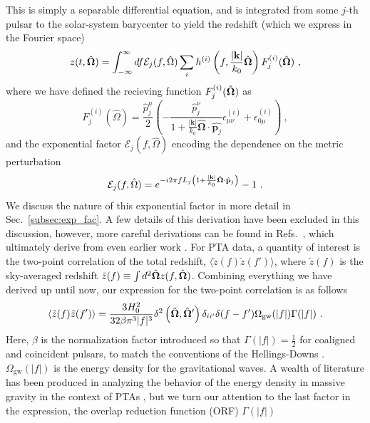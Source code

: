 \documentclass[prd,aps,psfig,nofootinbib,nobibnotes,superscriptaddress,preprintnumbers,times]{revtex4-2}\setlength{\topmargin}{-14mm}
\begin{document}
This is simply a separable differential equation, and is integrated from some $j$-th pulsar to the solar-system barycenter to yield the redshift (which we express in the Fourier space)
\begin{equation}\label{eqn:redshift}
    z(t, \hat{\bf \Omega}) = \int_{-\infty}^\infty df \mathcal{E}_j(f, \hat{\Omega}) \sum_i h^{(i)}\left(f, \frac{|{\bf k}|}{k_0} \hat{\bf \Omega}\right)F^{(i)}_j(\hat{\bf \Omega}) \ ,
\end{equation}
where we have defined the recieving function $F^{(i)}_j(\hat{\bf \Omega}) $ as 
\begin{equation}\label{eqn:recieving}
    F^{(i)}_j(\hat{\Omega}) = \frac{\hat{p}^\mu_j}{2}\left(-\frac{\hat{p}^\nu_j}{1+\frac{|\boldsymbol{k}|}{k_0} \hat{\boldsymbol{\Omega}} \cdot \hat{\boldsymbol{p}_j}} \epsilon_{\mu \nu}^{(i)}+\epsilon_{0 \mu}^{(i)}\right) \ ,
\end{equation}
and the exponential factor $\mathcal{E}_j(f, \hat{\Omega})$ encoding the dependence on the metric perturbation
\begin{equation}
    \mathcal{E}_j(f, \hat{\Omega}) = e^{-i2\pi f L_j\left( 1 + \frac{|{\bf k}|}{k_0} \hat{\bf \Omega}\cdot \hat{\bf p}_j\right)} - 1 \ . 
\end{equation}
We discuss the nature of this exponential factor in more detail in Sec.\ \ref{subsec:exp_fac}. A few details of this derivation have been excluded in this discussion, however, more careful derivations can be found in Refs.\ \cite{Anholm:2008wy, Liang:2021bct}, which ultimately derive from even earlier work \cite{Detweiler:1979wn, Estabrook:1975jtn, Kaufmann:1970}.
For PTA data, a quantity of interest is the two-point correlation of the total redshift, $\langle \tilde{z}(f) \tilde{z}(f') \rangle$, where $\tilde{z}(f)$ is the sky-averaged redshift $\tilde{z}(f) \equiv \int d^2\hat{\bf \Omega} z(f, \hat{\bf \Omega})$. Combining everything we have derived up until now, our expression for the two-point correlation is as follows
\begin{equation}\label{eqn:two_point_z}
    \langle \tilde{z}(f) \tilde{z}(f') \rangle = \frac{3H_0^2}{32 \beta \pi^3|f|^3}\delta^2\left(\hat{\bf \Omega} , \hat{\bf \Omega}'\right)\delta_{ii'}\delta(f - f')\Omega_{\text{gw}}(|f|) \Gamma(|f|) \ .
\end{equation}
Here, $\beta$ is the normalization factor introduced so that $\Gamma(|f|) = \frac{1}{2}$ for coaligned and coincident pulsars, to match the conventions of the Hellings-Downs \cite{Romano:2023zhb}. $\Omega_{\text{gw}}(|f|)$ is the energy density for the gravitational waves. A wealth of literature has been produced in analyzing the behavior of the energy density in massive gravity in the context of PTAs \cite{Choi:2023tun, Wu:2023rib, Kenjale:2024rsc, He:2021bqm}, but we turn our attention to the last factor in the expression, the overlap reduction function (ORF) $\Gamma(|f|)$ 
\end{document}
